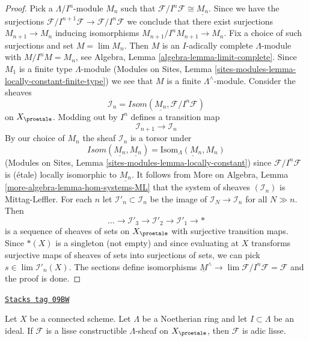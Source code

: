 \begin{proof}
Pick a $\Lambda/I^n$-module $M_n$ such that
$\mathcal{F}/I^n\mathcal{F} \cong \underline{M_n}$.
Since we have the surjections
$\mathcal{F}/I^{n + 1}\mathcal{F} \to \mathcal{F}/I^n\mathcal{F}$
we conclude that there
exist surjections $M_{n + 1} \to M_n$ inducing isomorphisms
$M_{n + 1}/I^nM_{n + 1} \to M_n$. Fix a choice of such surjections
and set $M = \lim M_n$. Then $M$ is an $I$-adically complete
$\Lambda$-module with $M/I^nM = M_n$, see
Algebra, Lemma \ref{algebra-lemma-limit-complete}.
Since $M_1$ is a finite type $\Lambda$-module
(Modules on Sites, Lemma
\ref{sites-modules-lemma-locally-constant-finite-type})
we see that $M$ is a finite $\Lambda^\wedge$-module.
Consider the sheaves
$$
\mathcal{I}_n = \mathit{Isom}(\underline{M_n}, \mathcal{F}/I^n\mathcal{F})
$$
on $X_\proetale$. Modding out by $I^n$ defines a transition map
$$
\mathcal{I}_{n + 1} \longrightarrow \mathcal{I}_n
$$
By our choice of $M_n$ the sheaf $\mathcal{I}_n$ is a torsor under
$$
\mathit{Isom}(\underline{M_n}, \underline{M_n}) =
\underline{\text{Isom}_\Lambda(M_n, M_n)}
$$
(Modules on Sites, Lemma \ref{sites-modules-lemma-locally-constant})
since $\mathcal{F}/I^n\mathcal{F}$ is (\'etale) locally isomorphic
to $\underline{M_n}$. It follows from
More on Algebra, Lemma \ref{more-algebra-lemma-hom-systems-ML}
that the system of sheaves $(\mathcal{I}_n)$ is Mittag-Leffler.
For each $n$ let $\mathcal{I}'_n \subset \mathcal{I}_n$ be the
image of $\mathcal{I}_N \to \mathcal{I}_n$ for all $N \gg n$.
Then
$$
\ldots \to \mathcal{I}'_3 \to \mathcal{I}'_2 \to \mathcal{I}'_1 \to *
$$
is a sequence of sheaves of sets on $X_\proetale$ with surjective
transition maps. Since $*(X)$ is a singleton (not empty)
and since evaluating at $X$ transforms surjective maps of sheaves of sets
into surjections of sets, we can pick
$s \in \lim \mathcal{I}'_n(X)$. The sections define isomorphisms
$\underline{M}^\wedge \to \lim \mathcal{F}/I^n\mathcal{F} = \mathcal{F}$
and the proof is done.
\end{proof}

\begin{lemma}
\label{proetale-lemma-connected-lisse}
\href{https://stacks.math.columbia.edu/tag/09BW}{\texttt{Stacks tag 09BW}}

Let $X$ be a connected scheme. Let $\Lambda$ be a Noetherian ring and let
$I \subset \Lambda$ be an ideal. If $\mathcal{F}$ is a lisse
constructible $\Lambda$-sheaf on $X_\proetale$, then $\mathcal{F}$
is adic lisse.
\end{lemma}

